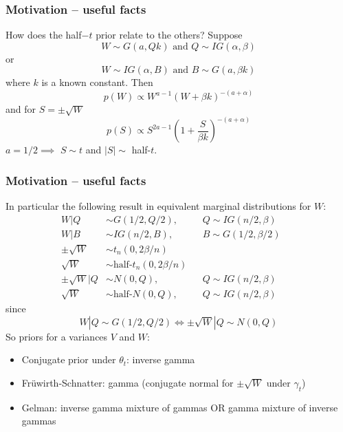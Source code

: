 \documentclass[xcolor=dvipsnames]{beamer}
\begin{document}


\begin{frame}
\frametitle{Motivation -- useful facts}
How does the half$-t$ prior relate to the others? Suppose
\[
W\sim G(a,Qk) \mbox{ and } Q\sim IG(\alpha,\beta)
\]
or
\[
W\sim IG(\alpha, B) \mbox{ and } B\sim G(a,\beta k)
\]
where $k$ is a known constant. \pause Then
\[
p(W) \propto W^{a-1}(W + \beta k)^{-(a + \alpha)}
\]
\pause
and for $S=\pm\sqrt{W}$
\[
p(S) \propto S^{2a-1}\left(1 + \frac{S}{\beta k}\right)^{-(a + \alpha)}
\]
$a=1/2 \implies $ $S\sim t$ and $|S| \sim$ half-$t$. 
\end{frame}

\begin{frame}
\frametitle{Motivation -- useful facts}
In particular the following result in equivalent marginal distributions for $W$:
\begin{align*}
W|Q &\sim G(1/2,Q/2), &&Q\sim IG(n/2,\beta)\\
W|B &\sim IG(n/2,B), &&B\sim G(1/2,\beta/2)\\
\pm\sqrt{W} &\sim t_n(0,2\beta/n) &&\\
\sqrt{W} &\sim \mbox{half-}t_n(0,2\beta/n)&&\\
\pm\sqrt{W}|Q &\sim N(0,Q), && Q\sim IG(n/2,\beta)&&\\
\sqrt{W} &\sim \mbox{half-}N(0,Q), && Q\sim IG(n/2,\beta)&&
\end{align*}
since
\[
W|Q\sim G(1/2,Q/2) \iff \pm \sqrt{W}|Q \sim N(0,Q)
\]
\pause So priors for a variances $V$ and $W$:
\begin{itemize}
\item Conjugate prior under $\theta_t$: inverse gamma
\item Fr{\"u}wirth-Schnatter: gamma (conjugate normal for $\pm\sqrt{W}$ under $\gamma_t$)
\item Gelman: inverse gamma mixture of gammas OR gamma mixture of inverse gammas
\end{itemize}
\end{frame}
\end{document}
